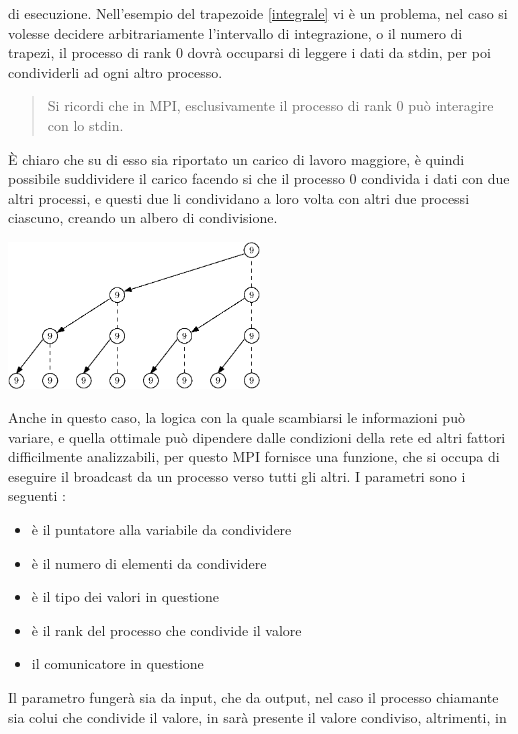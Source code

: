 \documentclass[10pt, letterpaper]{report}
\begin{document}
di esecuzione. Nell'esempio del trapezoide \ref{integrale} vi è un problema, nel caso si volesse decidere arbitrariamente 
l'intervallo di integrazione, o il numero di trapezi, il processo di rank 0 dovrà occuparsi di leggere i dati da stdin, per poi 
condividerli ad ogni altro processo.\begin{quote}
    \color{gray}Si ricordi che in MPI, esclusivamente il processo di rank 0 può interagire con lo stdin.\color{black}
\end{quote}
È chiaro che su di esso sia riportato un carico di lavoro maggiore, è quindi possibile suddividere il carico facendo si 
che il processo 0 condivida i dati con due altri processi, e questi due li condividano a loro volta con altri due processi ciascuno, 
creando un albero di condivisione.\begin{center}
    \includegraphics[width=0.5\textwidth]{images/tree3.eps}
\end{center}
Anche in questo caso, la logica con la quale scambiarsi le informazioni può variare, e quella ottimale può dipendere 
dalle condizioni della rete ed altri fattori difficilmente analizzabili, per questo MPI fornisce una funzione, 
 che si occupa di eseguire il broadcast da un processo verso tutti gli altri. I parametri sono 
i seguenti : \begin{itemize}
    \item {} è il puntatore alla variabile da condividere
    \item {} è il numero di elementi da condividere
    \item {} è il tipo dei valori in questione
    \item {} è il rank del processo che condivide il valore
    \item {} il comunicatore in questione
\end{itemize}
Il parametro  fungerà sia da input, che da output, nel caso il processo chiamante sia 
colui che condivide il valore, in  sarà presente il valore condiviso, altrimenti, in   
\end{document}
